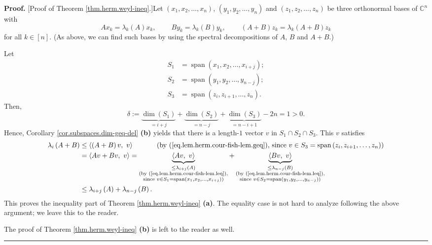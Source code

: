 \documentclass[numbers=enddot,12pt,final,onecolumn,notitlepage]{scrartcl}%
\numberwithin{exer}{subsection}
\theoremstyle{definition}
\newenvironment{proof}[1][Proof]{\noindent\textbf{#1.} }{\ \rule{0.5em}{0.5em}}
\begin{document}
\begin{proof}
[Proof of Theorem \ref{thm.herm.weyl-ineq}.]Let $\left(  x_{1},x_{2}%
,\ldots,x_{n}\right)  $, $\left(  y_{1},y_{2},\ldots,y_{n}\right)  $ and
$\left(  z_{1},z_{2},\ldots,z_{n}\right)  $ be three orthonormal bases of
$\mathbb{C}^{n}$ with%
\[
Ax_{k}=\lambda_{k}\left(  A\right)  x_{k},\ \ \ \ \ \ \ \ \ \ By_{k}%
=\lambda_{k}\left(  B\right)  y_{k},\ \ \ \ \ \ \ \ \ \ \left(  A+B\right)
z_{k}=\lambda_{k}\left(  A+B\right)  z_{k}%
\]
for all $k\in\left[  n\right]  $. (As above, we can find such bases by using
the spectral decompositions of $A$, $B$ and $A+B$.)

Let
\begin{align*}
S_{1}  &  =\operatorname*{span}\left(  x_{1},x_{2},\ldots,x_{i+j}\right)  ;\\
S_{2}  &  =\operatorname*{span}\left(  y_{1},y_{2},\ldots,y_{n-j}\right)  ;\\
S_{3}  &  =\operatorname*{span}\left(  z_{i},z_{i+1},\ldots,z_{n}\right)  .
\end{align*}
Then,%
\[
\delta:=\underbrace{\dim\left(  S_{1}\right)  }_{=i+j}+\underbrace{\dim\left(
S_{2}\right)  }_{=n-j}+\underbrace{\dim\left(  S_{3}\right)  }_{=n-i+1}%
-2n=1>0.
\]
Hence, Corollary \ref{cor.subspaces.dim-geq-del} \textbf{(b)} yields that
there is a length-$1$ vector $v$ in $S_{1}\cap S_{2}\cap S_{3}$. This $v$
satisfies%
\begin{align*}
\lambda_{i}\left(  A+B\right)   &  \leq\left\langle \left(  A+B\right)
v,\ v\right\rangle \ \ \ \ \ \ \ \ \ \ \left(  \text{by
(\ref{eq.lem.herm.cour-fish-lem.geq}), since }v\in S_{3}=\operatorname*{span}%
\left(  z_{i},z_{i+1},\ldots,z_{n}\right)  \right) \\
&  =\left\langle Av+Bv,\ v\right\rangle =\underbrace{\left\langle
Av,\ v\right\rangle }_{\substack{\leq\lambda_{i+j}\left(  A\right)
\\\text{(by (\ref{eq.lem.herm.cour-fish-lem.leq}),}\\\text{since }v\in
S_{1}=\operatorname*{span}\left(  x_{1},x_{2},\ldots,x_{i+j}\right)  \text{)}%
}}+\underbrace{\left\langle Bv,\ v\right\rangle }_{\substack{\leq\lambda
_{n-j}\left(  B\right)  \\\text{(by (\ref{eq.lem.herm.cour-fish-lem.leq}%
),}\\\text{since }v\in S_{2}=\operatorname*{span}\left(  y_{1},y_{2}%
,\ldots,y_{n-j}\right)  \text{)}}}\\
&  \leq\lambda_{i+j}\left(  A\right)  +\lambda_{n-j}\left(  B\right)  .
\end{align*}
This proves the inequality part of Theorem \ref{thm.herm.weyl-ineq}
\textbf{(a)}. The equality case is not hard to analyze following the above
argument; we leave this to the reader.

The proof of Theorem \ref{thm.herm.weyl-ineq} \textbf{(b)} is left to the
reader as well.
\end{proof}
\end{document}

